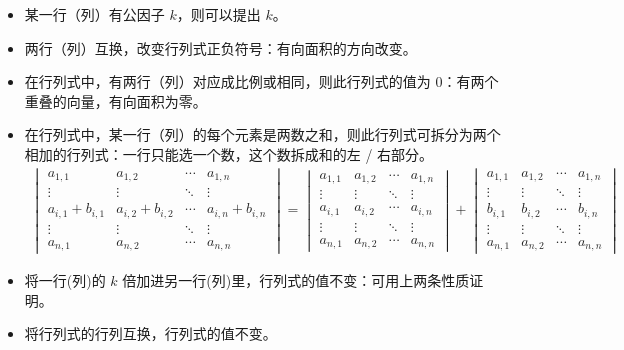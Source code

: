 \begin{itemize}
    \item 某一行（列）有公因子 $k$，则可以提出 $k$。
    \item 两行（列）互换，改变行列式正负符号：有向面积的方向改变。
    \item 在行列式中，有两行（列）对应成比例或相同，则此行列式的值为 $0$：有两个重叠的向量，有向面积为零。
    \item 在行列式中，某一行（列）的每个元素是两数之和，则此行列式可拆分为两个相加的行列式：一行只能选一个数，这个数拆成和的左 / 右部分。
    $$
            \begin{aligned}
                \begin{vmatrix}
                    a_{1,1} & a_{1,2} & \cdots & a_{1,n} \\
                    \vdots & \vdots & \ddots & \vdots \\
                    a_{i,1}+b_{i,1} & a_{i,2}+b_{i,2} & \cdots & a_{i,n}+b_{i,n} \\
                    \vdots & \vdots & \ddots & \vdots \\
                    a_{n,1} & a_{n,2} & \cdots & a_{n,n}
                \end{vmatrix} 
                =
                \begin{vmatrix}
                    a_{1,1} & a_{1,2} & \cdots & a_{1,n} \\
                    \vdots & \vdots & \ddots & \vdots \\
                    a_{i,1} & a_{i,2} & \cdots & a_{i,n} \\
                    \vdots & \vdots & \ddots & \vdots \\
                    a_{n,1} & a_{n,2} & \cdots & a_{n,n}
                \end{vmatrix}
                +
                \begin{vmatrix}
                    a_{1,1} & a_{1,2} & \cdots & a_{1,n} \\
                    \vdots & \vdots & \ddots & \vdots \\
                    b_{i,1} & b_{i,2} & \cdots & b_{i,n} \\
                    \vdots & \vdots & \ddots & \vdots \\
                    a_{n,1} & a_{n,2} & \cdots & a_{n,n}
                \end{vmatrix}
            \end{aligned}
    $$
    \item 将一行(列)的 $k$ 倍加进另一行(列)里，行列式的值不变：可用上两条性质证明。
    \item 将行列式的行列互换，行列式的值不变。
\end{itemize}

